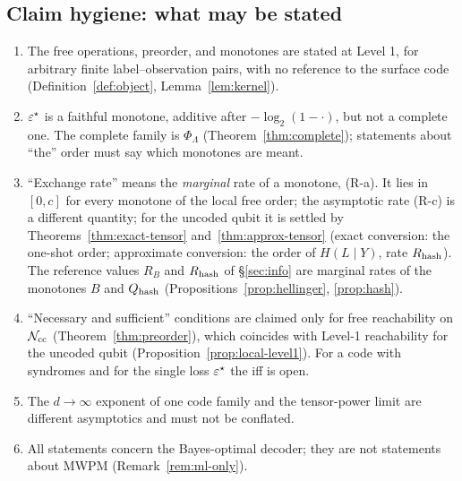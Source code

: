 \subsection{Claim hygiene: what may be stated}\label{sec:hygiene}
\begin{enumerate}[(1)]
\item The free operations, preorder, and monotones are stated at Level 1, for arbitrary finite label--observation pairs, with no reference to the surface code (Definition~\ref{def:object}, Lemma~\ref{lem:kernel}).
\item $\varepsilon^{\star}$ is a faithful monotone, additive after $-\log_2(1-\cdot)$, but not a complete one. The complete family is $\Phi_\Lambda$ (Theorem~\ref{thm:complete}); statements about ``the'' order must say which monotones are meant.
\item ``Exchange rate'' means the \emph{marginal} rate of a monotone, (R-a). It lies in $[0,c]$ for every monotone of the local free order; the asymptotic rate (R-c) is a different quantity; for the uncoded qubit it is settled by Theorems~\ref{thm:exact-tensor} and~\ref{thm:approx-tensor} (exact conversion: the one-shot order; approximate conversion: the order of $H(L\mid Y)$, rate $R_{\rm hash}$). The reference values $R_B$ and $R_{\rm hash}$ of \S\ref{sec:info} are marginal rates of the monotones $B$ and $Q_{\rm hash}$ (Propositions~\ref{prop:hellinger}, \ref{prop:hash}).
\item ``Necessary and sufficient'' conditions are claimed only for free reachability on $\mathcal{N}_{\rm cc}$ (Theorem~\ref{thm:preorder}), which coincides with Level-1 reachability for the uncoded qubit (Proposition~\ref{prop:local-level1}). For a code with syndromes and for the single loss $\varepsilon^{\star}$ the iff is open.
\item The $d\to\infty$ exponent of one code family and the tensor-power limit are different asymptotics and must not be conflated.
\item All statements concern the Bayes-optimal decoder; they are not statements about MWPM (Remark~\ref{rem:ml-only}).
\end{enumerate}
